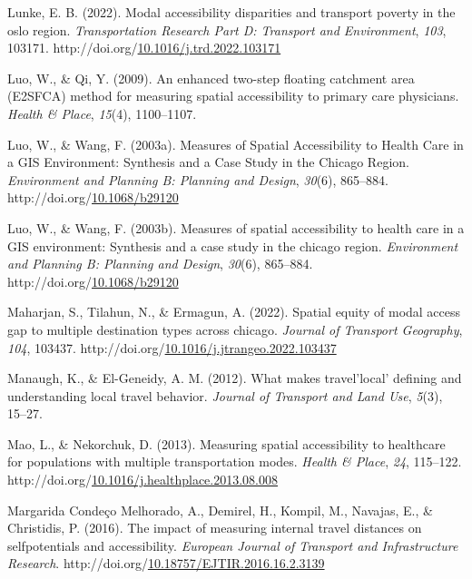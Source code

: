 \documentclass[
11pt, %
oneside, %
english, %
singlespacing, %
]{macthesis} %
\newlength{\cslhangindent}
\newenvironment{CSLReferences}[2] %
{\begin{list}{}{%
	\setlength{\itemindent}{0pt}
	\setlength{\leftmargin}{0pt}
	\setlength{\parsep}{0pt}
	\ifodd #1
	\setlength{\leftmargin}{\cslhangindent}
	\setlength{\itemindent}{-1\cslhangindent}
	\fi
	\setlength{\itemsep}{#2\baselineskip}}}
{\end{list}}
\begin{document}
\begin{CSLReferences}{1}{0}
Lunke, E. B. (2022). Modal accessibility disparities and transport poverty in the oslo region. \emph{Transportation Research Part D: Transport and Environment}, \emph{103}, 103171. http://doi.org/\href{https://doi.org/10.1016/j.trd.2022.103171}{10.1016/j.trd.2022.103171}

Luo, W., \& Qi, Y. (2009). An enhanced two-step floating catchment area ({E2SFCA}) method for measuring spatial accessibility to primary care physicians. \emph{Health \& Place}, \emph{15}(4), 1100--1107.

Luo, W., \& Wang, F. (2003a). Measures of Spatial Accessibility to Health Care in a GIS Environment: Synthesis and a Case Study in the Chicago Region. \emph{Environment and Planning B: Planning and Design}, \emph{30}(6), 865--884. http://doi.org/\href{https://doi.org/10.1068/b29120}{10.1068/b29120}

Luo, W., \& Wang, F. (2003b). Measures of spatial accessibility to health care in a {GIS} environment: Synthesis and a case study in the chicago region. \emph{Environment and Planning B: Planning and Design}, \emph{30}(6), 865--884. http://doi.org/\href{https://doi.org/10.1068/b29120}{10.1068/b29120}

Maharjan, S., Tilahun, N., \& Ermagun, A. (2022). Spatial equity of modal access gap to multiple destination types across chicago. \emph{Journal of Transport Geography}, \emph{104}, 103437. http://doi.org/\href{https://doi.org/10.1016/j.jtrangeo.2022.103437}{10.1016/j.jtrangeo.2022.103437}

Manaugh, K., \& El-Geneidy, A. M. (2012). What makes travel'local' defining and understanding local travel behavior. \emph{Journal of Transport and Land Use}, \emph{5}(3), 15--27.

Mao, L., \& Nekorchuk, D. (2013). Measuring spatial accessibility to healthcare for populations with multiple transportation modes. \emph{Health \& Place}, \emph{24}, 115--122. http://doi.org/\href{https://doi.org/10.1016/j.healthplace.2013.08.008}{10.1016/j.healthplace.2013.08.008}

Margarida Condeço Melhorado, A., Demirel, H., Kompil, M., Navajas, E., \& Christidis, P. (2016). The impact of measuring internal travel distances on selfpotentials and accessibility. \emph{European Journal of Transport and Infrastructure Research}. http://doi.org/\href{https://doi.org/10.18757/EJTIR.2016.16.2.3139}{10.18757/EJTIR.2016.16.2.3139}


\end{CSLReferences}
\end{document}
